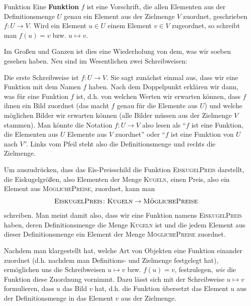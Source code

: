 \documentclass[../../main.tex]{subfiles}
\begin{document}
\begin{definition}{Funktion}
Eine \textbf{Funktion} $f$ ist eine Vorschrift, die allen Elementen aus der Definitionsmenge $U$ genau ein Element aus der Zielmenge $V$ zuordnet, geschrieben $f\colon U\rightarrow V$. Wird ein Element $u\in U$ einem Element $v\in V$ zugeordnet, so schreibt man $f(u)=v$ bzw. $u\mapsto v$.
\end{definition}

Im Großen und Ganzen ist dies eine Wiederholung von dem, was wir soeben gesehen haben. Neu sind im Wesentlichen zwei Schreibweisen: 

Die erste Schreibweise ist \mbox{$f\colon U\rightarrow V$}. Sie sagt zunächst einmal aus, dass wir eine Funktion mit dem Namen $f$ haben. Nach dem Doppelpunkt erklären wir dann, was für eine Funktion $f$ ist, d.h. von welchen Werten wir erwarten können, dass $f$ ihnen ein Bild zuordnet (das macht $f$ genau für die Elemente aus $U$) und welche möglichen Bilder wir erwarten können (alle Bilder müssen aus der Zielmenge $V$ stammen). Man könnte die Notation $f\colon U\rightarrow V$ also lesen als \enquote{$f$ ist eine Funktion, die Elementen aus $U$ Elemente aus $V$ zuordnet} oder \enquote{$f$ ist eine Funktion von $U$ nach $V$}. Links vom Pfeil steht also die Definitionsmenge und rechts die Zielmenge.

\begin{example}{}
    Um auszudrücken, dass das Eis-Preisschild die Funktion \textsc{EiskugelPreis} darstellt, die Eiskugelgrößen, also Elementen der Menge \textsc{Kugeln}, einen Preis, also ein Element aus \textsc{MöglichePreise}, zuordnet, kann man \[\textsc{EiskugelPreis}\colon\textsc{Kugeln}\rightarrow\textsc{MöglichePreise}\] schreiben. Man meint damit also, dass wir eine Funktion namens \textsc{EiskugelPreis} haben, deren Definitionsmenge die Menge \textsc{Kugeln} ist und die jedem Element aus dieser Definitionsmenge ein Element der Menge \textsc{MöglichePreise} zuordnet.
\end{example}

Nachdem man klargestellt hat, welche Art von Objekten eine Funktion einander zuordnet (d.h. nachdem man Definitions- und Zielmenge festgelegt hat), ermöglichen uns die Schreibweisen $u\mapsto v$ bzw. $f(u)=v$, festzulegen, \emph{wie} die Funktion diese Zuordnung vornimmt. Dazu lässt sich mit der Schreibweise $u\mapsto v$ formulieren, dass $u$ das Bild $v$ hat, d.h. die Funktion übersetzt das Element $u$ aus der Definitionsmenge in das Element $v$ aus der Zielmenge.
\end{document}
